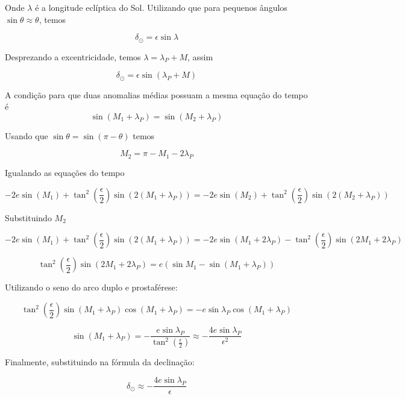 \documentclass[11pt]{article}
\begin{document}
\begin{pproblem}
\begin{pssolution*}{}{ }
\begin{alternativas}
        Onde \(\lambda \) é a longitude eclíptica do Sol. Utilizando que para pequenos ângulos \(\sin\theta \approx \theta\), temos

        \[\delta_\odot = \epsilon\sin\lambda\]

        Desprezando a excentricidade, temos \(\lambda = \lambda_P + M\), assim

        \[\boxed{\delta_\odot = \epsilon\sin(\lambda_P + M)}\]

        \item A condição para que duas anomalias médias possuam a mesma equação do tempo é 
        \[\sin(M_1+\lambda_P) = \sin(M_2+\lambda_P)\]

        Usando que \(\sin\theta = \sin(\pi-\theta)\) temos

        \[\boxed{M_2 =\pi -M_1-2\lambda_P}\]

        \item Igualando as equações do tempo
        
        \[-2e\sin(M_1) + \tan^2 \left( \frac{\epsilon}{2} \right)\sin\left(2(M_1 + \lambda_P) \right) = -2e\sin(M_2) + \tan^2 \left( \frac{\epsilon}{2} \right)\sin\left(2(M_2 + \lambda_P) \right)\]

        Substituindo \(M_2\)  

        \[-2e\sin(M_1) + \tan^2 \left( \frac{\epsilon}{2} \right)\sin\left(2(M_1 + \lambda_P) \right) = -2e\sin(M_1+2\lambda_P) - \tan^2 \left( \frac{\epsilon}{2} \right)\sin\left(2M_1 + 2\lambda_P \right)\]

        \[\tan^2 \left( \frac{\epsilon}{2} \right)\sin(2M_1+2\lambda_P) = e(\sin M_1 - \sin(M_1+\lambda_P))\]

        Utilizando o seno do arco duplo e prostaférese:

        \[\tan^2\left(\frac{\epsilon}{2}\right)\sin(M_1+\lambda_P)\cos(M_1+\lambda_P) = -e\sin\lambda_P\cos(M_1+\lambda_P)\]

        \[\sin(M_1+\lambda_P) = -\frac{e\sin\lambda_P}{\tan^2\left(\frac{\epsilon}{2}\right)}\approx -\frac{4e\sin\lambda_P}{\epsilon^2}\]

        Finalmente, substituindo na fórmula da declinação:

        \[\boxed{\delta_\odot \approx -\frac{4e\sin\lambda_P}{\epsilon}}\]
    \end{alternativas}
\end{pssolution*}
\end{pproblem}
\end{document}
